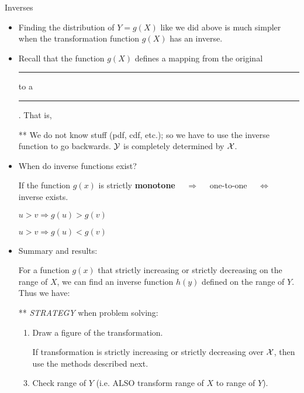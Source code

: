 \documentclass{article}
\newcommand{\blankul}[1]{\rule[-1.5mm]{#1}{0.15mm}}	%
\begin{document}
Inverses\bigskip
\begin{itemize}
    \item Finding the distribution of $Y = g(X)$ like we did above is much simpler when the transformation function $g(X)$ has an inverse.
    \item Recall that the function $g(X)$ defines a mapping from the original \blankul{3cm} to a \blankul{3cm}. That is,\vspace{100pt}
    \item[] ** We do not know stuff (pdf, cdf, etc.); so we have to use the inverse function to go backwards. ${\cal Y}$ is completely determined by $\cal{X}$.
    \item When do inverse functions exist?
    \item[] If the function $g(x)$ is strictly \textbf{monotone} $\quad \Longrightarrow \quad $ one-to-one $\quad  \Longleftrightarrow \quad$ inverse exists.
    \item[] $u > v \Rightarrow g(u) > g(v)$\smallskip
    \item[] $u > v \Rightarrow g(u) < g(v)$
    \item Summary and results:
    \item[] For a function $g(x)$ that strictly increasing or strictly decreasing on the range of $X$, we can find an inverse function $h(y)$ defined on the range of $Y$. Thus we have:\vspace{30pt}
    \item[**] \textit{STRATEGY} when problem solving:
    \begin{enumerate}
        \item Draw a figure of the transformation.
        \item[] If transformation is strictly increasing or strictly decreasing over ${\cal X}$, then use the methods described next.
        \item Check range of $Y$ (i.e. ALSO transform range of $X$ to range of $Y$).
    \end{enumerate}
\end{itemize}\bigskip
\end{document}
